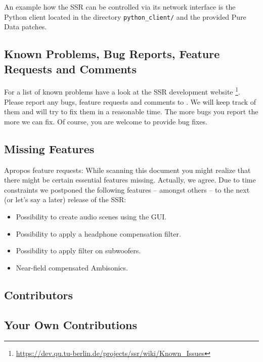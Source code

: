 An example how the SSR can be controlled via its network interface is the
Python client located in the directory \verb|python_client/| and the provided
Pure Data patches.

\subsection{Known Problems, Bug Reports, Feature Requests and Comments}

For a list of known problems have a look at the SSR development website%
\footnote{\url{https://dev.qu.tu-berlin.de/projects/ssr/wiki/Known_Issues}}.
Please report any bugs, feature requests and comments to
\contactadress. We will keep track of them and will try to fix them
in a reasonable time. The more bugs you report the more we can fix.
Of course, you are welcome to provide bug fixes.~\smiley

\subsection{Missing Features}

Apropos feature requests: While scanning this document you might realize that
there might be certain essential features missing. Actually, we agree. Due to
time constraints we postponed the following features -- amongst others -- to
the next (or let's say a later) release of the SSR:

\begin{itemize}
\item Possibility to create audio scenes using the GUI.
\item Possibility to apply a headphone compensation filter.
\item Possibility to apply filter on subwoofers.
\item Near-field compensated Ambisonics.
\end{itemize}

\subsection{Contributors}


\subsection{Your Own Contributions}

